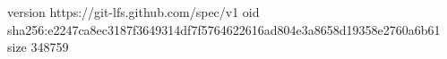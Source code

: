 version https://git-lfs.github.com/spec/v1
oid sha256:e2247ca8ec3187f3649314df7f5764622616ad804e3a8658d19358e2760a6b61
size 348759
